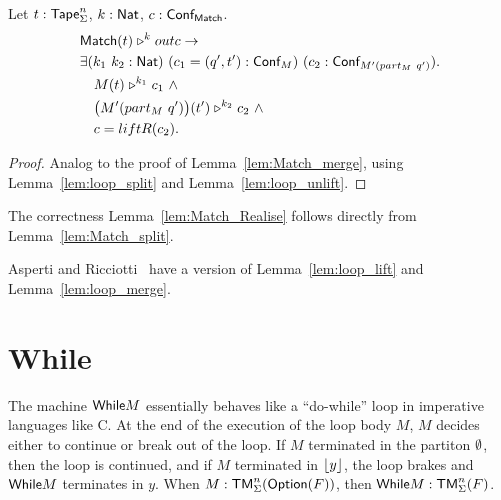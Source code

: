 \begin{lemma}
  \label{lem:Match_split}
  Let $t : \textsf{Tape}_\Sigma^n$, $k : \textsf{Nat}$, $c : \textsf{Conf}_{\textsf{Match}}$.
  \begin{align*}
    & \textsf{Match}(t) \mathrel{\triangleright}^k outc \rightarrow \\
    & \exists (k_1~k_2 : \textsf{Nat})~(c_1 = (q', t') : \textsf{Conf}_M)~(c_2 : \textsf{Conf}_{M'(part_M~q')}). \\
    & \quad M(t) \mathrel{\triangleright}^{k_1} c_1 ~\land~ \\
    & \quad \bigl( M' (part_M~q') \bigr) (t') \mathrel{\triangleright}^{k_2} c_2 ~\land~ \\
    & \quad c = liftR(c_2).
  \end{align*}
\end{lemma}
\begin{proof}
  Analog to the proof of Lemma~\ref{lem:Match_merge}, using Lemma~\ref{lem:loop_split} and Lemma~\ref{lem:loop_unlift}.
\end{proof}
The correctness Lemma~\ref{lem:Match_Realise} follows directly from Lemma~\ref{lem:Match_split}.


Asperti and Ricciotti~\cite{asperti2015} have a version of Lemma~\ref{lem:loop_lift} and Lemma~\ref{lem:loop_merge}.

\section{While}
\label{sec:While}


The machine $\textsf{While} M$ essentially behaves like a ``do-while'' loop in imperative languages like C.  At the end of the execution of the loop body $M$,
$M$ decides either to continue or break out of the loop.  If $M$ terminated in the partiton $\emptyset$, then the loop is continued, and if $M$ terminated
in $\left\lfloor {y} \right\rfloor$, the loop brakes and $\textsf{While} M$ terminates in $y$.  When $M : \textsf{TM}_\Sigma^n(\textsf{Option}(F))$, then $\textsf{While} M : \textsf{TM}_\Sigma^n(F)$.


